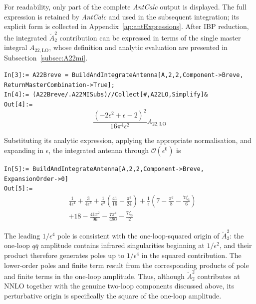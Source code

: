 For readability, only part of the complete \textit{AntCalc} output is displayed. The full expression
is retained by \textit{AntCalc} and used in the subsequent integration; its explicit form is collected
in Appendix~\ref{ap:antExpressions}.
After IBP reduction, the integrated $\breve A_2^2$ contribution can be expressed in terms of the single
master integral $A_{22,\mathrm{LO}}$, whose definition and analytic evaluation are presented in
Subsection~\ref{subsec:A22mi}.

\begin{mdframed}[backgroundcolor=gray!10, linewidth=0pt]
\texttt{In[3]:= A22Breve = BuildAndIntegrateAntenna[A,2,2,Component->Breve,\\ReturnMasterCombination->True];}\\
\texttt{In[4]:= (A22Breve/.A22MISubs)//Collect[\#,A22LO,Simplify]\&}\\
\hfill
\texttt{Out[4]:=}
    \begin{equation*}
        \frac{\left(-2\epsilon^2+\epsilon-2\right)^2}{16\pi^4\epsilon^2}A_{22,\text{LO}}
    \end{equation*}
\end{mdframed}
Substituting its analytic expression, applying the appropriate normalisation, and expanding in
$\epsilon$, the integrated antenna through $\mathcal O(\epsilon^0)$ is

\begin{mdframed}[backgroundcolor=gray!10, linewidth=0pt]
\texttt{In[5]:= BuildAndIntegrateAntenna[A,2,2,Component->Breve,\\ExpansionOrder->0]}\\
\hfill
\texttt{Out[5]:=}
    \begin{equation*}
        \begin{split}
            &\frac1{4\epsilon^4}+\frac3{4\epsilon^3}+\frac{1}{\epsilon^2}\left(\frac{41}{16}-\frac{\pi^2}{24}\right)+\frac{1}{\epsilon}\left(7-\frac{\pi^2}8-\frac{7\zeta_3}{6}\right)\\
            &+18-\frac{41\pi^2}{96}-\frac{7\pi^4}{480}-\frac{7\zeta_3}{2}
        \end{split}
    \end{equation*}
\end{mdframed}

The leading $1/\epsilon^4$ pole is consistent with the one-loop-squared origin of $\breve A_2^2$: the
one-loop $q\bar q$ amplitude contains infrared singularities beginning at $1/\epsilon^2$, and their
product therefore generates poles up to $1/\epsilon^4$ in the squared contribution. The lower-order
poles and finite term result from the corresponding products of pole and finite terms in the one-loop
amplitude. Thus, although $\breve A_2^2$ contributes at NNLO together with the genuine two-loop
components discussed above, its perturbative origin is specifically the square of the one-loop
amplitude.

